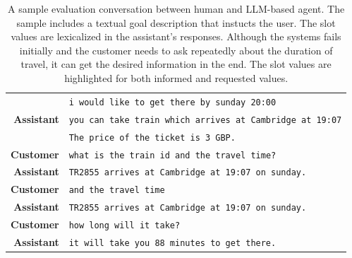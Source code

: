 \begin{table}[tp]
\begin{tabular}{r|l}
        & \texttt{i would like to get there by {\color{cyan!80!yellow!80!black!100 }sunday 20:00}} \\
        \textbf{Assistant} & \texttt{you can take train which arrives at Cambridge at  {\color{orange!50!yellow!90!black!100!}19:07}} \\
        & \texttt{The price of the ticket is {\color{orange!50!yellow!90!black!100!}3 GBP}.} \\
        \textbf{Customer} & \texttt{what is the {\color{orange!50!yellow!90!black!100!}train id} and the {\color{orange!50!yellow!90!black!100!}travel time?}} \\
        \textbf{Assistant} & \texttt{{\color{orange!50!yellow!90!black!100!}TR2855} arrives at Cambridge at 19:07 on sunday.} \\
        \textbf{Customer} & \texttt{and the travel time} \\
        \textbf{Assistant} & \texttt{{\color{red!100!yellow!90!black!100!}TR2855 arrives at Cambridge at 19:07 on sunday.}} \\
        \textbf{Customer} & \texttt{how long will it take?} \\
        \textbf{Assistant} & \texttt{it will take you {\color{orange!50!yellow!90!black!100!}88 minutes} to get there. }\\
        \bottomrule
    \end{tabular}
    \caption{A sample evaluation conversation between human and LLM-based agent. The sample includes a textual goal description that instucts the user. The slot values are lexicalized in the assistant's responses. Although the systems {\color{red!100!yellow!90!black!100!}fails initially} and the customer needs to ask repeatedly about the duration of travel, it can get the desired information in the end. The slot values are highlighted for both {\color{cyan!80!yellow!80!black!100 }informed} and {\color{orange!50!yellow!90!black!100!}requested} values.}
    \label{07:tab:human-1}
\end{table}

